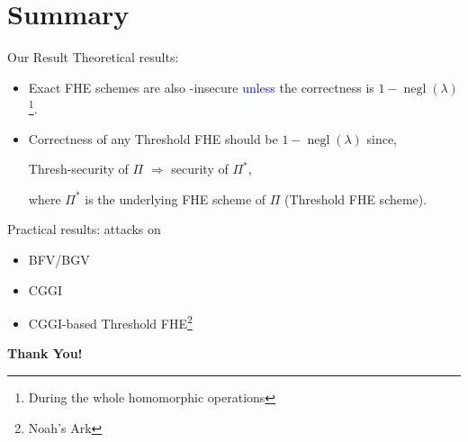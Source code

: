 \documentclass{beamer}
\begin{document}
 \section{Summary}
    \begin{frame}{Our Result}
    \small
    Theoretical results: 
    \begin{itemize}
        \item Exact FHE schemes are also \indcpad-insecure \textcolor{blue}{unless} the correctness is $1-\operatorname{negl}(\lambda)$\footnote{During the whole homomorphic operations}.
        \item Correctness of any Threshold FHE should be $1-\operatorname{negl}(\lambda)$ since, 
        \begin{center}
            {\sf Thresh-}\indcpa security of $\Pi$ $\Rightarrow$ \indcpad security of $\Pi^*$,
        \end{center}
        where $\Pi^*$ is the underlying FHE scheme of $\Pi$ (Threshold FHE scheme).
    \end{itemize}\vspace{0.3cm}
    
    Practical results: \krd attacks on
        \begin{itemize}
            \item BFV/BGV
            \item CGGI
            \item CGGI-based Threshold FHE\footnote{Noah's Ark}
        \end{itemize}\vspace{0.3cm}
    \end{frame}
    
    \begin{frame}{}
    \begin{center}
        {\Huge\bf Thank You!}
    \end{center}
    \end{frame}
\end{document}
